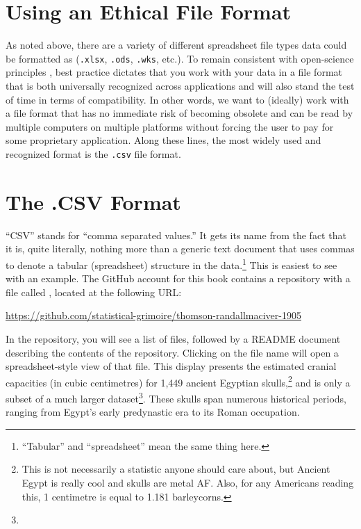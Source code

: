 \section{Using an Ethical File Format}
\label{sec:ethical_file}

As noted above, there are a variety of different spreadsheet file types data could be formatted as (\texttt{.xlsx}, \texttt{.ods}, \texttt{.wks}, etc.). To remain consistent with open-science principles \parencite{UNESCO_open_sci}, best practice dictates that you work with your data in a file format that is both universally recognized across applications and will also stand the test of time in terms of compatibility.  In other words, we want to (ideally) work with a file format that has no immediate risk of becoming obsolete and can be read by multiple computers on multiple platforms without forcing the user to pay for some proprietary application. Along these lines, the most widely used and recognized format is the \texttt{.csv} file format.

\section{The .CSV Format}

``CSV'' stands for ``comma separated values.'' It gets its name from the fact that it is, quite literally, nothing more than a generic text document that uses commas to denote a tabular (spreadsheet) structure in the data.\footnote{``Tabular'' and ``spreadsheet'' mean the same thing here.} This is easiest to see with an example. The GitHub account for this book contains a repository with a file called , located at the following URL:

\begin{center}
\url{https://github.com/statistical-grimoire/thomson-randallmaciver-1905}
\end{center}

\noindent
In the repository, you will see a list of files, followed by a README document describing the contents of the repository. Clicking on the file name  will open a spreadsheet-style view of that file. This display presents the estimated cranial capacities (in cubic centimetres) for 1,449 ancient Egyptian skulls,\footnote{This is not necessarily a statistic anyone should care about, but Ancient Egypt is really cool and skulls are metal AF. Also, for any Americans reading this, 1 centimetre is equal to 1.181 barleycorns.} and is only a subset of a much larger dataset\footnote{}. These skulls span numerous historical periods, ranging from Egypt's early predynastic era to its Roman occupation.

